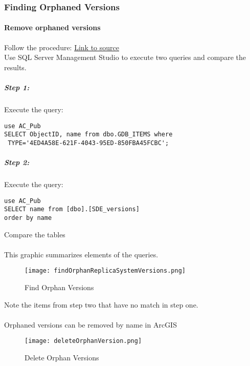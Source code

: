 \subsubsection[Orphaned Versions]{\Large Finding Orphaned Versions}
\paragraph[Remove orphaned versions]{Remove orphaned versions \texorpdfstring{\\}{}}
Follow the procedure:
\href{https://support.esri.com/en/technical-article/000010858}{Link to source}\\
Use SQL Server Management Studio to execute two queries and compare the results.
\subparagraph*{Step 1: \texorpdfstring{\\}{}}
Execute the query:
\begin{verbatim}
use AC_Pub
SELECT ObjectID, name from dbo.GDB_ITEMS where
 TYPE='4ED4A58E-621F-4043-95ED-850FBA45FCBC';
\end{verbatim}
\subparagraph*{Step 2: \texorpdfstring{\\}{}}
Execute the query:
\begin{verbatim}
use AC_Pub
SELECT name from [dbo].[SDE_versions]
order by name

\end{verbatim}
\clearpage
Compare the tables
\paragraph*{}This graphic summarizes elements of the queries.
\begin{figure}[h!]
\centering
    \texttt{[image: findOrphanReplicaSystemVersions.png]}
\caption{Find Orphan Versions}
\end{figure}
Note the items from step two that have no match in step one.
\clearpage

\paragraph*{}Orphaned versions can be removed by name in ArcGIS
\begin{figure}[h!]
\centering
    \texttt{[image: deleteOrphanVersion.png]}
\caption{Delete Orphan Versions}
\end{figure}
\clearpage


